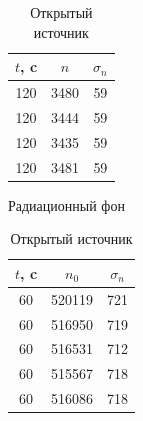 \documentclass[a4paper,12pt]{article} %
\begin{document}
   \begin{table}[!htb]
    \begin{minipage}{.5\linewidth}
      \centering
        \begin{tabular}{|c|c|c|}
        \hline
        $t$, c &  $n$ & $\sigma_n$ \\ \hline
        120  &  3480  &  59 \\ \hline
        120  &  3444  &  59 \\ \hline
        120  &  3435  &  59 \\ \hline
        120  &  3481  &  59 \\ \hline
        \end{tabular}
    	\centering
    	\caption{Радиационный фон}
    	\label{dark}
    \end{minipage}%
    \begin{minipage}{.5\linewidth}
      \centering
        \begin{tabular}{|c|c|c|}
        \hline
        $t$, c &  $n_0$ & $\sigma_n$ \\ \hline
        60  &  520119  &  721 \\ \hline
        60  &  516950  &  719 \\ \hline
        60  &  516531  &  712 \\ \hline
        60  &  515567  &  718 \\ \hline
        60  &  516086 &  718 \\ \hline
        \end{tabular}
    	\centering
    	\caption{Открытый источник}
    	\label{dark}
    \end{minipage} 
\end{table}
\end{document}
